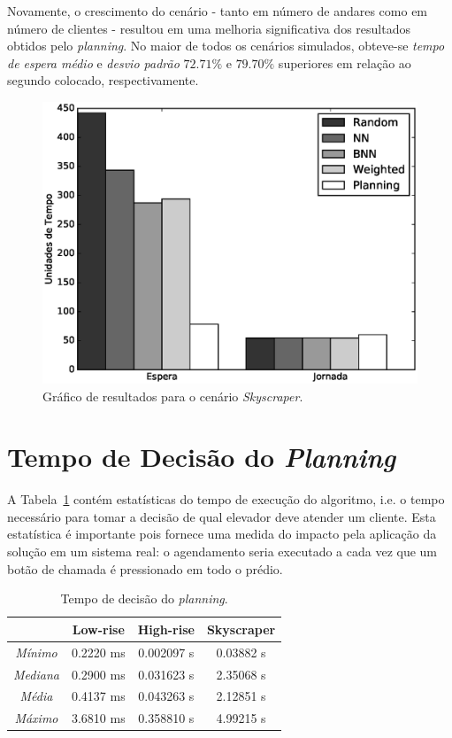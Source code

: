 Novamente, o crescimento do cenário - tanto em número de andares como em número
de clientes - resultou em uma melhoria significativa dos resultados obtidos pelo
\textit{planning}. No maior de todos os cenários simulados, obteve-se
\textit{tempo de espera médio} e \textit{desvio padrão} $72.71\%$ e $79.70\%$
superiores em relação ao segundo colocado, respectivamente.

\begin{figure}[htb!]
  \centering
  \includegraphics[scale=0.6]{img/skyscraper-average-times-chart}
  \caption{Gráfico de resultados para o cenário \textit{Skyscraper}.}
  \label{fig:result:average:skyscraper}
\end{figure}

\section{Tempo de Decisão do \textit{Planning}}

A Tabela~\ref{table:results:time} contém estatísticas do tempo de execução do
algoritmo, i.e. o tempo necessário para tomar a decisão de qual elevador deve
atender um cliente. Esta estatística é importante pois fornece uma medida do
impacto pela aplicação da solução em um sistema real: o agendamento seria
executado a cada vez que um botão de chamada é pressionado em todo o prédio.

\begin{table}[htb!]
\centering
\caption{Tempo de decisão do \textit{planning}.}
\label{table:results:time}
\begin{tabular}{|c|c|c|c|}
\hline
                 & \textbf{Low-rise} & \textbf{High-rise} & \textbf{Skyscraper} \\ \hline
\textit{Mínimo}  & 0.2220 ms         & 0.002097 s         & 0.03882 s           \\ \hline
\textit{Mediana} & 0.2900 ms         & 0.031623 s         & 2.35068 s           \\ \hline
\textit{Média}   & 0.4137 ms         & 0.043263 s         & 2.12851 s           \\ \hline
\textit{Máximo}  & 3.6810 ms         & 0.358810 s         & 4.99215 s           \\ \hline
\end{tabular}
\end{table}

